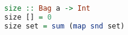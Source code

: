 \begin{lstlisting}[language=haskell]
size :: Bag a -> Int
size [] = 0
size set = sum (map snd set)
\end{lstlisting}